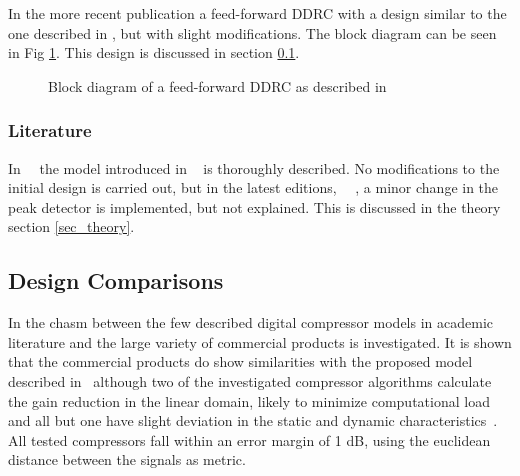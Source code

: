 \documentclass[../main2.tex]{subfiles}
\providecommand{\rootdir}{..}
\begin{document}
In the more recent publication \cite{reiss2012tutorial} a feed-forward DDRC with a design similar to the one described in  \cite{mcnally1984dynamic}, but with slight modifications. The block diagram can be seen in Fig \ref{fig:block_giannoulis}. This design is discussed in section \ref{background_design_comp}.
\begin{figure}
\centerline{}
\caption{Block diagram of a feed-forward DDRC as described in \cite{reiss2012tutorial}}
\label{fig:block_giannoulis}
\end{figure}

\subsubsection{Literature}
In~\cite{zolzer1997digital}~\cite{dafx02} the model introduced in ~\cite{mcnally1984dynamic} is thoroughly described. No modifications to the initial design is carried out, but in the latest editions,~\cite{zoelzer2008digital} ~\cite{dafx11}, a minor change in the peak detector is implemented, but not explained. This is discussed in the theory section \ref{sec_theory}.
\subsection{Design Comparisons} \label{background_design_comp}
In \cite{bitzer2006parameter} the chasm between the few described digital compressor models in academic literature and the large variety of commercial products is investigated. It is shown that the commercial products do show similarities with the proposed model described in~\cite{mcnally1984dynamic}\cite{zolzer2008digital}\cite{dafx11} although two of the investigated compressor algorithms calculate the gain reduction in the linear domain, likely to minimize computational load and all but one have slight deviation in the static and dynamic characteristics~\cite{bitzer2006parameter}. All tested compressors fall within an error margin of 1 dB, using the euclidean distance between the signals as metric.
\end{document}
